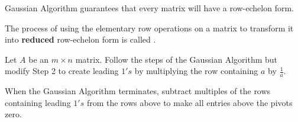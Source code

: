 \documentclass{ximera}
\begin{document}
Gaussian Algorithm guarantees that every matrix will have a row-echelon form. 

\begin{definition}\label{def:GaussJordanElimination}
  The process of using the elementary row operations on a matrix to transform it into \textbf{reduced} row-echelon form is called .
  \end{definition}

  \begin{algorithm} \label{alg:gauss-jordan}
    Let $A$ be an $m\times n$ matrix.
    Follow the steps of the Gaussian Algorithm but modify Step 2 to create leading $1's$ by multiplying the row containing $a$ by $\frac{1}{a}$.
     
     
     
     
     
    When the Gaussian Algorithm terminates, subtract multiples of the rows containing leading $1's$ from the rows above to make all entries above the pivots zero.
    \end{algorithm}
\end{document}
